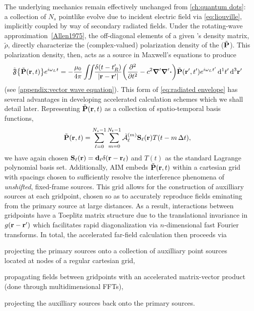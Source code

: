 The underlying mechanics remain effectively unchanged from \cref{ch:quantum dots}: a collection of $N_s$ pointlike \qds{} evolve due to incident electric field via \cref{eq:liouville}, implicitly coupled by way of secondary radiated fields.
Under the rotating-wave approximation~\cref{Allen1975}, the off-diagonal elements of a given \qd's density matrix, $\tilde{\rho}$, directly characterize the (complex-valued) polarization density of the \qd{} ($\tilde{\vb{P}}$).
This polarization density, then, acts as a source in Maxwell's equations to produce
\begin{equation}
  \tilde{\mathfrak{F}}\qty{\tilde{\vb{P}}(\vb{r}, t)}e^{i \omega_L t} = -\frac{\mu_0}{4\pi} \iint_{} \kern0.1em \frac{\delta(t - t'_R)}{\abs{\vb{r} - \vb{r}'}} \qty(\pdv[2]{t} - c^2 \grad' \grad'\boldsymbol{\cdot}) \tilde{\vb{P}}(\vb{r}', t') e^{i \omega_L t'} \dd[1]{t'} \dd[3]{\vb{r}'}
  \label{eq:envelope propagator}
\end{equation}
(see \cref{appendix:vector wave equation}).
This form of \cref{eq:radiated envelope} has several advantages in developing accelerated calculation schemes which we shall detail later.
Representing $\tilde{\vb{P}}(\vb{r}, t)$ as a collection of spatio-temporal basis functions,
\begin{equation}
  \tilde{\vb{P}}(\vb{r}, t) = \sum_{\ell = 0}^{N_s - 1} \sum_{m = 0}^{N_t - 1} \tilde{\mathcal{A}}_\ell^{(m)} \vb{S}_\ell(\vb{r}) T(t - m \, \Delta t),
\end{equation}
we have again chosen $\vb{S}_\ell(\vb{r}) = \vb{d}_\ell \delta(\vb{r} - \vb{r}_\ell)$ and $T(t)$ as the standard Lagrange polynomial basis set.
Additionally, AIM embeds $\tilde{\vb{P}}(\vb{r}, t)$ within a cartesian grid with spacings chosen to sufficiently resolve the interference phenomena of \emph{unshifted}, fixed-frame sources.
This grid allows for the construction of auxilliary sources at each gridpoint, chosen so as to accurately reproduce fields eminating from the primary source at large distances.
As a result, interactions between gridpoints have a Toeplitz matrix structure due to the translational invariance in $g(\vb{r} - \vb{r}')$ which facilitates rapid diagonalization via $n$-dimensional fast Fourier transforms.
In total, the accelerated far-field calculation then proceeds via
\begin{inparaenum}[(i)]
  \item projecting the primary sources onto a collection of auxilliary point sources located at nodes of a regular cartesian grid,
  \item propagating fields between gridpoints with an accelerated matrix-vector product (done through multidimensional FFTs),
  \item projecting the auxilliary sources back onto the primary sources.
\end{inparaenum}

